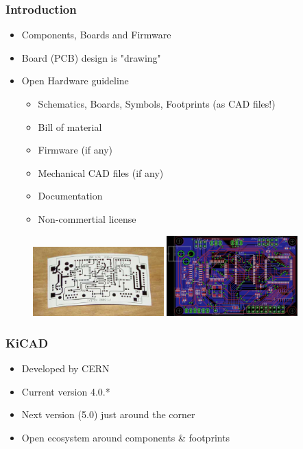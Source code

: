 \documentclass{beamer}
\begin{document}
\begin{frame}
  \frametitle{Introduction}
  \begin{itemize}
    \item Components, Boards and Firmware
    \item Board (PCB) design is "drawing"
    \item Open Hardware guideline
      \begin{itemize}
        \item Schematics, Boards, Symbols, Footprints (as CAD files!)
        \item Bill of material
        \item Firmware (if any)
        \item Mechanical CAD files (if any)
        \item Documentation
        \item Non-commertial license
      \end{itemize}
  \end{itemize}

  \begin{figure}[H]
    \centering
    \includegraphics[width=0.45\textwidth]{images/pcb_on_paper.jpg}
    \includegraphics[width=0.45\textwidth]{images/pcb_in_kicad.jpg}
  \end{figure}
\end{frame}


\begin{frame}
  \frametitle{KiCAD}
  \begin{itemize}
    \item Developed by CERN
    \item Current version 4.0.*
    \item Next version (5.0) just around the corner
    \item Open ecosystem around components \& footprints
  \end{itemize}
\end{frame}
\end{document}
